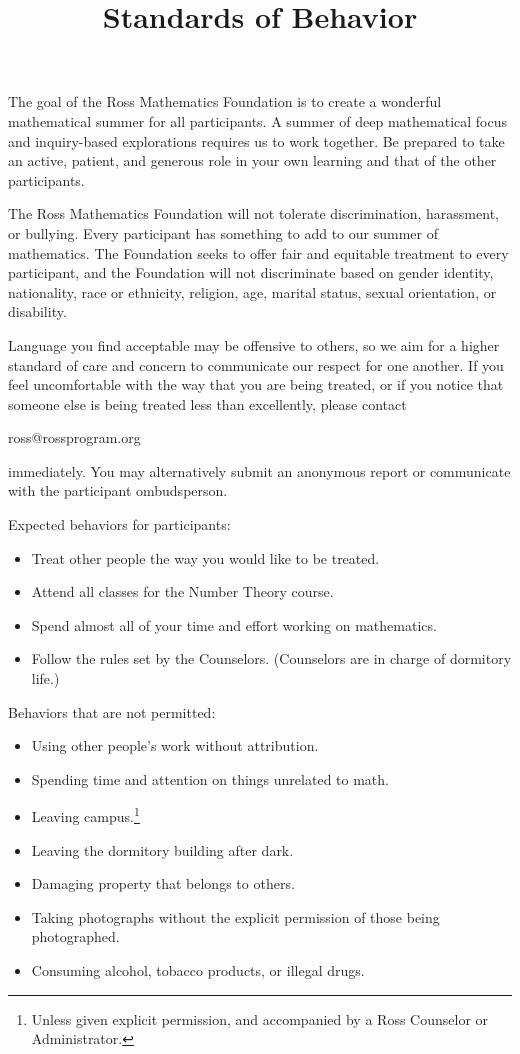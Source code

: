 \documentclass{ross}
\title{Standards of Behavior}
\makeatletter
\newcommand\footnoteref[1]{\protected@xdef\@thefnmark{\ref{#1}}\@footnotemark}
\makeatother
\begin{document}
\maketitle

The goal of the Ross Mathematics Foundation is to create a wonderful
mathematical summer for all participants.  A summer of deep
mathematical focus and inquiry-based explorations requires us to work
together.  Be prepared to take an active, patient, and generous role
in your own learning and that of the other participants.

The Ross Mathematics Foundation will not tolerate discrimination,
harassment, or bullying.  Every participant has something to add to
our summer of mathematics.  The Foundation seeks to offer fair and
equitable treatment to every participant, and the Foundation will not
discriminate based on gender identity, nationality, race or ethnicity,
religion, age, marital status, sexual orientation, or disability.

Language you find acceptable may be offensive to others, so we aim for
a higher standard of care and concern to communicate our respect for
one another.  If you feel uncomfortable with the way that you are being
treated, or if you notice that someone else is being treated less than
excellently, please contact 
\begin{center}
  \color{blue} \ttfamily ross@rossprogram.org
\end{center}
immediately.
You may alternatively submit an anonymous report or communicate with
the participant ombudsperson.

Expected behaviors for participants:
\begin{itemize}
\item Treat other people the way you would like to be treated.
\item Attend all classes for the Number Theory course.
\item Spend almost all of your time and effort working on mathematics.
\item Follow the rules set by the Counselors. (Counselors are in charge of dormitory life.)
\end{itemize}

Behaviors that are not permitted:
\begin{itemize}
\item Using other people's work without attribution.
\item Spending time and attention on things unrelated to math.
\item Leaving campus.\footnote{\label{counselors}Unless given explicit permission, and accompanied by a Ross Counselor or Administrator.}
\item Leaving the dormitory building after dark.\footnoteref{counselors}
\item Damaging property that belongs to others.
\item Taking photographs without the explicit permission of those being photographed.
\item Consuming alcohol, tobacco products, or illegal drugs.
\end{itemize}
\end{document}
